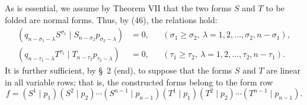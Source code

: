 \documentclass[10pt]{article}
\newcommand{\pair}[2]{(#1\mid #2)}
\begin{document}
As is essential, we assume by Theorem VII that the two forms $S$ and $T$ to
be folded are normal forms. Thus, by (46), the relations hold:
\begin{equation}
\begin{aligned}
\pair{q_{n-\sigma_1-\lambda}S^{\sigma_1}}
{S_{n-\sigma_2}p_{\sigma_2-\lambda}}&=0,
&& (\sigma_1\geq\sigma_2,\ \lambda=1,2,\ldots,\sigma_2,n-\sigma_1),\\
\pair{q_{n-\tau_1-\lambda}T^{\tau_1}}
{T_{n-\tau_2}p_{\tau_2-\lambda}}&=0,
&& (\tau_1\geq\tau_2,\ \lambda=1,2,\ldots,\tau_2,n-\tau_1).
\end{aligned}
\tag{62}
\end{equation}
It is further sufficient, by \S\ 2 (end), to suppose that the forms $S$ and
$T$ are linear in all variable rows; that is, the constructed forms belong
to the form row
\[
 f=\pair{S^1}{p_1}\pair{S^2}{p_2}\cdots\pair{S^{n-1}}{p_{n-1}}
   \pair{T^1}{p_1}\pair{T^2}{p_2}\cdots\pair{T^{n-1}}{p_{n-1}}.
\]
\end{document}
